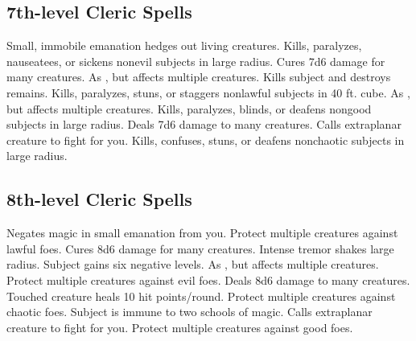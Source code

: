 \subsection{7th-level Cleric Spells}
\begin{spelllist}
   Small, immobile emanation hedges out living creatures.
   Kills, paralyzes, nauseatees, or sickens nonevil subjects in large radius.
   Cures 7d6 damage for many creatures.
   As , but affects multiple creatures.
  \F Kills subject and destroys remains.
   Kills, paralyzes, stuns, or staggers nonlawful subjects in 40 ft. cube.
   As , but affects multiple creatures.
   Kills, paralyzes, blinds, or deafens nongood subjects in large radius.
   Deals 7d6 damage to many creatures.
   Calls extraplanar creature to fight for you.
   Kills, confuses, stuns, or deafens nonchaotic subjects in large radius.
\end{spelllist}

\subsection{8th-level Cleric Spells}
\begin{spelllist}
   Negates magic in small emanation from you.
  \F Protect multiple creatures against lawful foes. 
   Cures 8d6 damage for many creatures.
   Intense tremor shakes large radius.
   Subject gains six negative levels.
   As , but affects multiple creatures.
  \F Protect multiple creatures against evil foes. 
   Deals 8d6 damage to many creatures.
   Touched creature heals 10 hit points/round.
  \F Protect multiple creatures against chaotic foes. 
   Subject is immune to two schools of magic.
   Calls extraplanar creature to fight for you.
  \F Protect multiple creatures against good foes. 
\end{spelllist}

